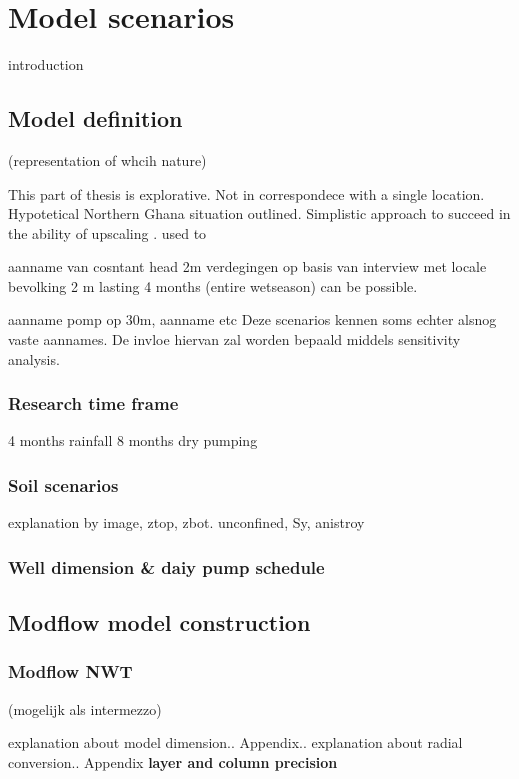 \chapter{Model scenarios}
\label{chapter:model_scenarios}
introduction

\section{Model definition}
(representation of whcih nature)

This part of thesis is explorative. Not in correspondece with a single location. 
Hypotetical Northern Ghana situation outlined. Simplistic approach to succeed in the ability of upscaling . used to

aanname van cosntant head 2m verdegingen op basis van interview met locale bevolking 2 m lasting 4 months (entire wetseason) can be possible. 

aanname pomp op 30m, aanname etc  
 Deze scenarios kennen soms echter alsnog vaste aannames. De invloe hiervan zal worden bepaald middels sensitivity analysis. 

\subsection{Research time frame} 
4 months rainfall
8 months dry pumping

\subsection{Soil scenarios} 
explanation by image, ztop, zbot. unconfined, Sy, anistroy

\subsection{Well dimension \& daiy pump schedule}

\section{Modflow model construction}

\subsection{Modflow NWT} (mogelijk als intermezzo)

explanation about model dimension.. Appendix..
explanation about radial conversion.. Appendix
\textbf{layer and column precision}

